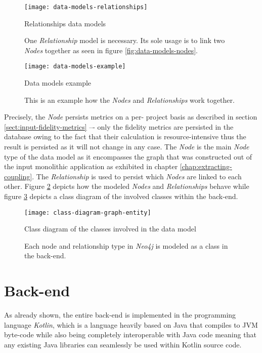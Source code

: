 \documentclass[12pt,a4paper]{report}
\begin{document}
\begin{figure}[htbp]
\centering
\texttt{[image: data-models-relationships]}
\caption{Relationships data models}
\caption*{\centering
  One \textit{Relationship} model is necessary. Its sole usage is to link
  two  \textit{Nodes} together as seen in figure \ref{fig:data-models-nodes}.
}
\label{fig:data-models-relationships}
\end{figure}

\begin{figure}[htbp]
\centering
\texttt{[image: data-models-example]}
\caption{Data models example}
\caption*{\centering
  This is an example how the \textit{Nodes} and \textit{Relationships} work together.
}
\label{fig:data-models-example}
\end{figure}

Precisely, the  \textit{Node} persists metrics on a per\hyp
project basis as described in section \ref{sect:input-fidelity-metrics} --\hyp
only the fidelity metrics are persisted in the database owing to the fact that
their calculation is resource\hyp intensive thus the result is persisted as it
will not change in any case. The  \textit{Node} is the main \textit{
Node} type of the data model as it encompasses the graph that was constructed
out of the input monolithic application as exhibited in chapter
\ref{chap:extracting-coupling}. The  \textit{Relationship}
is used to persist which  \textit{Nodes} are linked to each other.
Figure \ref{fig:data-models-example} depicts how the modeled \textit{Nodes}
and \textit{Relationships} behave while figure \ref{fig:class-diagram-graph-entity}
depicts a class diagram of the involved classes within the back-end.

\begin{figure}[htbp]
\centering
\texttt{[image: class-diagram-graph-entity]}
\caption{Class diagram of the classes involved in the data model}
\caption*{\centering
  Each node and relationship type in \textit{Neo4j} is modeled as a class
  in the back-end.
}
\label{fig:class-diagram-graph-entity}
\end{figure}



\section{Back-end} \label{sect:implementation-back-end}

As already shown, the entire back-end is implemented in the programming
language \textit{Kotlin}, which is a language heavily based on Java that
compiles to JVM byte-code while also being completely interoperable with Java
code meaning that any existing Java libraries can seamlessly be used within
Kotlin source code.
\end{document}
